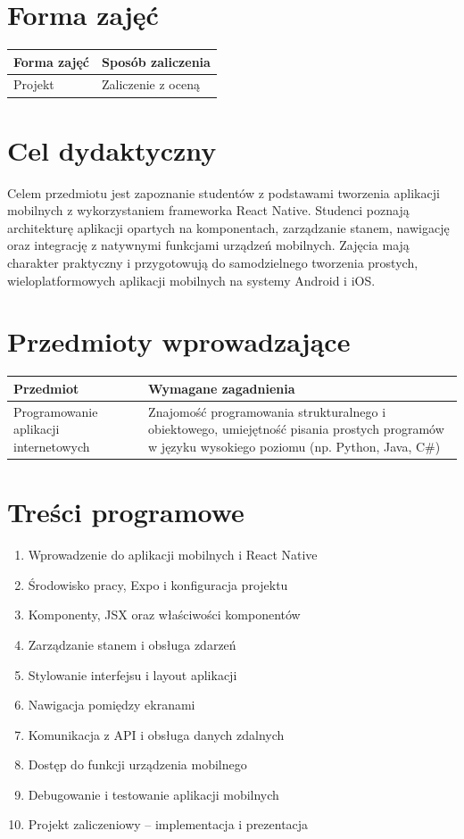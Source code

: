 \documentclass[12pt, a4paper]{article}
\begin{document}
\section{Forma zajęć}

\begin{tabular}{ll}
  \hline
  \textbf{Forma zajęć} & \textbf{Sposób zaliczenia} \\
  \hline
  Projekt & Zaliczenie z oceną \\
  \hline
\end{tabular}

\section{Cel dydaktyczny}

Celem przedmiotu jest zapoznanie studentów z podstawami tworzenia aplikacji mobilnych z wykorzystaniem frameworka React Native. Studenci poznają architekturę aplikacji opartych na komponentach, zarządzanie stanem, nawigację oraz integrację z natywnymi funkcjami urządzeń mobilnych. Zajęcia mają charakter praktyczny i przygotowują do samodzielnego tworzenia prostych, wieloplatformowych aplikacji mobilnych na systemy Android i iOS.

\section{Przedmioty wprowadzające}

\begin{tabularx}{\textwidth}{lX}
  \hline
  \textbf{Przedmiot} & \textbf{Wymagane zagadnienia} \\
  \hline
  Programowanie aplikacji internetowych & Znajomość programowania strukturalnego i obiektowego, umiejętność pisania prostych programów w języku wysokiego poziomu (np. Python, Java, C\#) \\
  \hline
\end{tabularx}

\section{Treści programowe}

\begin{enumerate}
  \item Wprowadzenie do aplikacji mobilnych i React Native
  \item Środowisko pracy, Expo i konfiguracja projektu
  \item Komponenty, JSX oraz właściwości komponentów
  \item Zarządzanie stanem i obsługa zdarzeń
  \item Stylowanie interfejsu i layout aplikacji
  \item Nawigacja pomiędzy ekranami
  \item Komunikacja z API i obsługa danych zdalnych
  \item Dostęp do funkcji urządzenia mobilnego
  \item Debugowanie i testowanie aplikacji mobilnych
  \item Projekt zaliczeniowy – implementacja i prezentacja
\end{enumerate}
\end{document}
